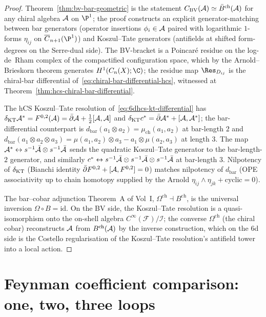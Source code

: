 \begin{proof}
Theorem~\ref{thm:bv-bar-geometric} is the statement
$C_{\mathrm{BV}}(\mathcal{A})\simeq \bar B^{\mathrm{ch}}(\mathcal{A})$ for any chiral algebra
$\mathcal{A}$ on $\P^1$; the proof constructs an explicit generator-matching
between bar generators (operator insertions $\phi_i\in\mathcal{A}$ paired
with logarithmic $1$-forms $\eta_{ij}$ on
$\overline C_{n+1}(\P^1)$) and Koszul--Tate generators (antifields at
shifted form-degrees on the Serre-dual side). The BV-bracket is a
Poincar\'e residue on the log-de~Rham complex of the compactified
configuration space, which by the Arnold--Brieskorn theorem generates
$H^1(C_n(X);\C)$; the residue map $\Res_{D_{ij}}$ is the chiral-bar
differential of~\eqref{eq:chiral-bar-differential-hcs}, witnessed at
Theorem~\ref{thm:hcs-chiral-bar-differential}.

The hCS Koszul--Tate resolution of~\eqref{eq:6dhcs-kt-differential}
has $\delta_{\mathrm{KT}}\mathcal{A}^* = F^{0,2}(\mathcal{A}) = \bar\partial\mathcal{A} + \tfrac12[\mathcal{A},\mathcal{A}]$ and
$\delta_{\mathrm{KT}} c^* = \bar\partial\mathcal{A}^* + [\mathcal{A},\mathcal{A}^*]$; the bar-differential
counterpart is $d_{\mathrm{bar}}(a_1\otimes a_2) = \mu_{\mathrm{ch}}(a_1,a_2)$
at bar-length $2$ and
$d_{\mathrm{bar}}(a_1\otimes a_2\otimes a_3) = \mu(a_1,a_2)\otimes a_3
 - a_1\otimes\mu(a_2,a_3)$ at length $3$. The map
$\mathcal{A}^*\leftrightarrow s^{-1}\bar{\mathcal{A}}\otimes s^{-1}\bar{\mathcal{A}}$ sends the
quadratic Koszul--Tate generator to the bar-length-$2$ generator, and
similarly $c^*\leftrightarrow s^{-1}\bar{\mathcal{A}}\otimes s^{-1}\bar{\mathcal{A}}\otimes
s^{-1}\bar{\mathcal{A}}$ at bar-length $3$. Nilpotency of $\delta_{\mathrm{KT}}$
(Bianchi identity $\bar\partial F^{0,2} + [\mathcal{A},F^{0,2}] = 0$) matches
nilpotency of $d_{\mathrm{bar}}$ (OPE associativity up to chain
homotopy supplied by the Arnold $\eta_{ij}\wedge\eta_{jk} +
\mathrm{cyclic} = 0$).

The bar--cobar adjunction Theorem~A of Vol~I, $\Omega^{\mathrm{ch}}
\dashv B^{\mathrm{ch}}$, is the universal inversion $\Omega\circ B
= \mathrm{id}$. On the BV side, the Koszul--Tate resolution is a
quasi-isomorphism onto the on-shell algebra
$C^\infty(\mathcal F)/\mathcal I$; the converse $\Omega^{\mathrm{ch}}$
(the chiral cobar) reconstructs $\mathcal{A}$ from
$B^{\mathrm{ch}}(\mathcal{A})$ by the inverse construction, which on the 6d
side is the Costello regularisation of the
Koszul--Tate resolution's antifield tower into a local action.
\end{proof}

\section{Feynman coefficient comparison: one, two, three loops}
\label{sec:cfg-feynman-compare}

